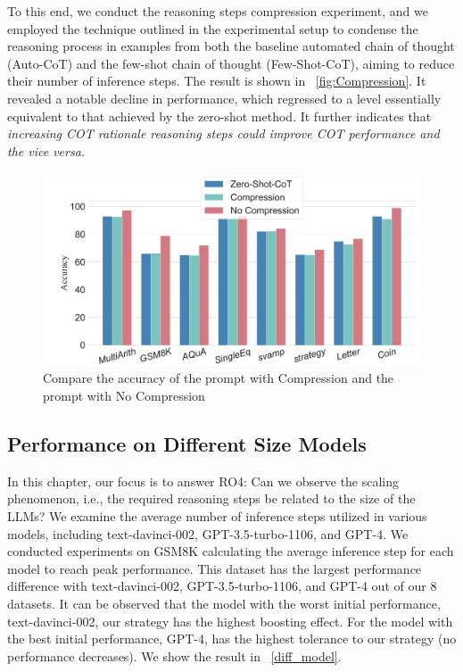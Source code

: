 \documentclass[11pt]{article}
\begin{document}
To this end, we conduct the reasoning steps compression experiment, and we employed the technique outlined in the experimental setup to condense the reasoning process in examples from both the baseline automated chain of thought (Auto-CoT) and the few-shot chain of thought (Few-Shot-CoT), aiming to reduce their number of inference steps. The result is shown in ~\autoref{fig:Compression}. It revealed a notable decline in performance, which regressed to a level essentially equivalent to that achieved by the zero-shot method. It further indicates that \emph{increasing COT rationale reasoning steps could improve COT performance and the vice versa.}
\begin{figure}[t]
    \centering
    \includegraphics[width=1\linewidth]{Compression.pdf}

   \caption{Compare the accuracy of the prompt with Compression and the prompt with No Compression}
    \label{fig:Compression}

\end{figure}


\phantom{Invisible Text}
\vspace{-\baselineskip}

\subsection{Performance on Different Size Models}

%
\label{section4.5}

In this chapter, our focus is to answer RO4: Can we observe the scaling phenomenon, i.e., the required reasoning steps be related to the size of the LLMs? We examine the average number of inference steps utilized in various models, including text-davinci-002, GPT-3.5-turbo-1106, and GPT-4. We conducted experiments on GSM8K calculating the average inference step for each model to reach peak performance. This dataset has the largest performance difference with text-davinci-002, GPT-3.5-turbo-1106, and GPT-4 out of our 8 datasets. It can be observed that the model with the worst initial performance, text-davinci-002, our strategy has the highest boosting effect. For the model with the best initial performance, GPT-4, has the highest tolerance to our strategy (no performance decreases). We show the result in ~\autoref{diff_model}.
\end{document}
